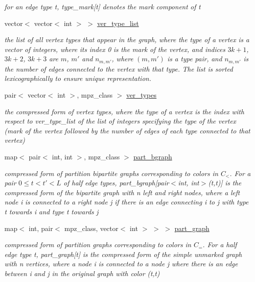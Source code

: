 \begin{DoxyCompactItemize}
\begin{DoxyCompactList}\small\item\em for an edge type t, type\+\_\+mark\mbox{[}t\mbox{]} denotes the mark component of t \end{DoxyCompactList}\item 
vector$<$ vector$<$ int $>$ $>$ \hyperlink{classmarked__graph__compressed_af2e3e55223d436628a02758dfae88493}{ver\+\_\+type\+\_\+list}
\begin{DoxyCompactList}\small\item\em the list of all vertex types that appear in the graph, where the type of a vertex is a vector of integers, where its index 0 is the mark of the vertex, and indices $3k+1$, $3k+2$, $3k+3$ are $m$, $m'$ and $n_{m,m'}$, where $(m,m')$ is a type pair, and $n_{m,m'}$ is the number of edges connected to the vertex with that type. The list is sorted lexicographically to ensure unique representation. \end{DoxyCompactList}\item 
pair$<$ vector$<$ int $>$, mpz\+\_\+class $>$ \hyperlink{classmarked__graph__compressed_af446cc5e23c241a92b76642fd5ebc403}{ver\+\_\+types}
\begin{DoxyCompactList}\small\item\em the compressed form of vertex types, where the type of a vertex is the index with respect to ver\+\_\+type\+\_\+list of the list of integers specifying the type of the vertex (mark of the vertex followed by the number of edges of each type connected to that vertex) \end{DoxyCompactList}\item 
map$<$ pair$<$ int, int $>$, mpz\+\_\+class $>$ \hyperlink{classmarked__graph__compressed_a7b3267063fba30b45eb21b3ba4e07536}{part\+\_\+bgraph}
\begin{DoxyCompactList}\small\item\em compressed form of partition bipartite graphs corresponding to colors in $C_<$. For a pair $0 \leq t < t' < L$ of half edge types, part\+\_\+bgraph\mbox{[}pair$<$int, int$>$(t,t\textquotesingle{})\mbox{]} is the compressed form of the bipartite graph with n left and right nodes, where a left node i is connected to a right node j if there is an edge connecting i to j with type t towards i and type t\textquotesingle{} towards j \end{DoxyCompactList}\item 
map$<$ int, pair$<$ mpz\+\_\+class, vector$<$ int $>$ $>$ $>$ \hyperlink{classmarked__graph__compressed_ae179a4737e6eab905c18a94d44ef64b7}{part\+\_\+graph}
\begin{DoxyCompactList}\small\item\em compressed form of partition graphs corresponding to colors in $C_=$. For a half edge type t, part\+\_\+graph\mbox{[}t\mbox{]} is the compressed form of the simple unmarked graph with n vertices, where a node i is connected to a node j where there is an edge between i and j in the original graph with color (t,t) \end{DoxyCompactList}\end{DoxyCompactItemize}



